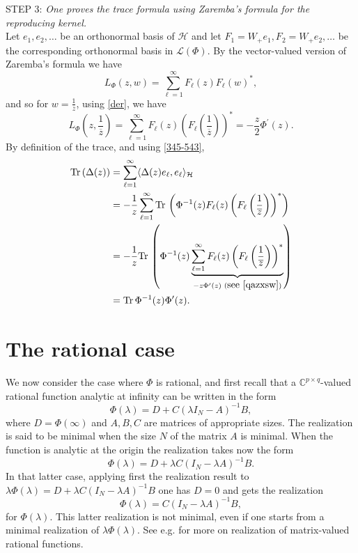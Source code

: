 \documentclass[12pt]{amsart}
\theoremstyle{definition}
\theoremstyle{remark}
\numberwithin{equation}{section}
\begin{document}
    STEP 3: {\sl One proves the trace formula using Zaremba's formula for the reproducing kernel.}\\

    Let $e_1,e_2,\ldots$ be an orthonormal basis of $\mathcal H$ and let $F_1=W_+e_1,F_2=W_+e_2,\ldots$ be the corresponding orthonormal basis in
    $\mathcal L(\Phi)$.     By the vector-valued version of Zaremba's formula we have
    \begin{equation}
      \label{zzrem}
L_\Phi(z,w)=\sum_{\ell=1}^\infty F_\ell(z)F_\ell(w)^*,
\end{equation}
and so for $w=\frac{1}{\overline{z}}$, using \eqref{der}, we have
\begin{equation}
  \label{qazxsw}
  L_\Phi(z,\frac{1}{\overline{z}})=\sum_{\ell=1}^\infty F_\ell(z)\left(F_\ell
    \left(\frac{1}{\overline{z}}\right)\right)^*=-\frac{z}{2}\Phi^{\prime}(z).
\end{equation}
By definition of the trace, and using \eqref{345-543},
    \[
      \begin{split}
        {\rm Tr}\, (\Delta(z))&=\sum_{\ell=1}^\infty \langle\Delta(z)e_\ell,e_\ell
                                \rangle_{\mathcal H}\\
            &=-\frac{1}{z}\sum_{\ell=1}^\infty {\rm Tr}\,\left(\Phi^{-1}(z)F_\ell(z)\left(F_\ell\left(\frac{1}{\overline{z}}\right)\right)^*\right)\\
      &=-\frac{1}{z}{\rm Tr}\,\left(\Phi^{-1}(z)\underbrace{\sum_{\ell=1}^\infty
          F_\ell(z)\left(F_\ell\left(\frac{1}{\overline{z}}\right)\right)^*}_{-z\Phi^\prime(z)\,\, (\mbox{{\rm see \eqref{qazxsw}}})}\right)\\
      &={\rm Tr}\, \Phi^{-1}(z)\Phi^\prime(z).
\end{split}
    \]








      \section{The rational case}
      \setcounter{equation}{0}
      \label{ra-case}
      We now consider the case where $\Phi$ is rational, and first recall that a $\mathbb C^{p\times q}$-valued rational function
      analytic at infinity can be written in the form
      \[
        \Phi({\lambda})=D+C({\lambda}I_N-A)^{-1}B,
      \]
      where $D=\Phi(\infty)$ and $A,B,C$ are matrices of appropriate sizes. The realization is said to be minimal when the size $N$ of the matrix $A$ is minimal. When the function
      is analytic at the origin the realization takes now the form
      \[
\Phi({\lambda})=D+{\lambda}C(I_N-{\lambda}A)^{-1}B.
\]
In that latter case, applying first the realization result to ${\lambda}\Phi({\lambda})=D+{\lambda}C(I_N-{\lambda}A)^{-1}B$ one has $D=0$ and gets the realization
\[
  \Phi({\lambda})=C(I_N-{\lambda}A)^{-1}B,
\]
for $\Phi({\lambda})$. This latter realization is not minimal, even if one starts from a minimal realization of ${\lambda}\Phi({\lambda})$. See e.g. \cite{MR2363355,MR2663312} for more on realization
of matrix-valued rational functions.\\
\end{document}

